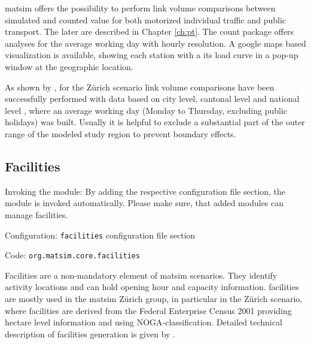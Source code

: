 \gls{matsim} offers the possibility to perform link volume comparisons between simulated and counted value for both motorized individual traffic \citep{Horni_unpub_IVT_2007}  and public transport. The later are described in Chapter \ref{ch:pt}. The count package offers analyses for the average working day with hourly resolution. A google maps based visualization is available, showing each station with a its load curve in a pop-up window at the geographic location.

As shown by \citet[][]{BalmerEtAl_ResRep_bdktzrh_2009}, for the Zürich scenario link volume comparisons have been successfully performed with data based on city level, cantonal level and national level \citep[][]{ASTRA_Webpage_2006}, where an average working day (Monday to Thursday, excluding public holidays) was built. Usually it is helpful to exclude a substantial part of the outer range of the modeled study region to prevent boundary effects.

\subsection{Facilities}
\label{sec:facilities}
\begin{compactitem}
\item Invoking the module: By adding the respective configuration file section, the module is invoked automatically. Please make sure, that added modules can manage facilities.
\item Configuration: \lstinline|facilities| configuration file section
\item Code: \lstinline|org.matsim.core.facilities|
\end{compactitem}

Facilities are a non-mandatory element of \gls{matsim} scenarios. They identify activity locations and can hold opening hour and capacity information. facilities are mostly used in the \gls{matsim} Zürich group, in particular in the Zürich scenario, where facilities are derived from the Federal Enterprise Census 2001 \citep[][]{SwissEnterpriseCensus_manual_2001} providing hectare level information and using NOGA-classification. Detailed technical description of facilities generation is given by \citet[][]{Meister_TechRep_IVT_2008, Meister_unpub_IVT_2007}.


